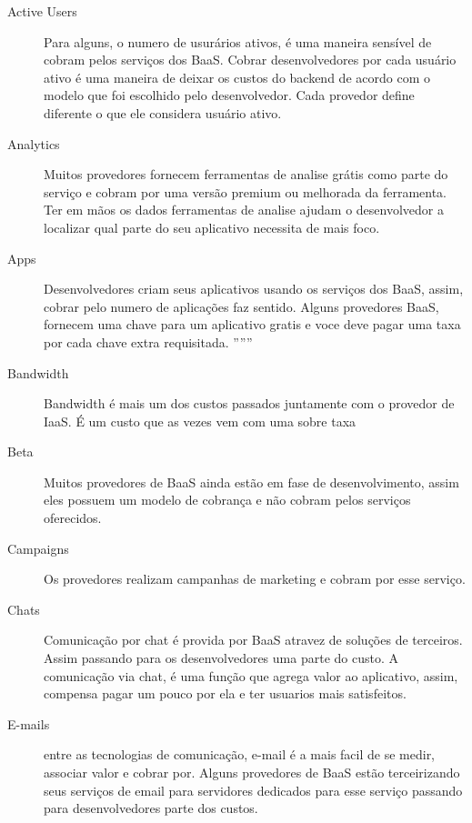 	\begin{description}
		\item[]	
		\item[Active Users] { Para alguns, o numero de usurários ativos, é uma maneira sensível de cobram pelos serviços dos BaaS. Cobrar desenvolvedores por cada usuário ativo é uma maneira de deixar os custos do backend de acordo com o modelo que foi escolhido pelo desenvolvedor. Cada provedor define diferente o que ele considera usuário ativo. }

		\item[Analytics] { Muitos provedores fornecem ferramentas de analise grátis como parte do serviço e cobram por uma versão premium ou melhorada da ferramenta. Ter em mãos os dados ferramentas de analise ajudam o desenvolvedor a localizar qual parte do seu aplicativo necessita de mais foco.}

		\item[Apps] { Desenvolvedores criam seus aplicativos usando os serviços dos BaaS, assim, cobrar pelo numero de aplicações faz sentido. Alguns provedores BaaS, fornecem uma chave para um aplicativo gratis e voce deve pagar uma taxa por cada chave extra requisitada.}
''''''
		\item[Bandwidth] { Bandwidth é mais um dos custos passados juntamente com o provedor de IaaS. É um custo que as vezes vem com uma sobre taxa}
		
		\item[Beta] { Muitos provedores de BaaS ainda estão em fase de desenvolvimento, assim eles possuem um modelo de cobrança e não cobram pelos serviços oferecidos.}
		
		\item[Campaigns] { Os provedores realizam campanhas de marketing  e cobram por esse serviço.}
		
		\item[Chats] { Comunicação por chat é provida por BaaS atravez de soluções de terceiros. Assim passando para os desenvolvedores uma parte do custo. A comunicação via chat, é uma função que agrega valor ao aplicativo, assim, compensa pagar um pouco por ela e ter usuarios mais satisfeitos. }
		
		\item[E-mails] { entre as tecnologias de comunicação, e-mail é a mais facil de se medir, associar valor e cobrar por. Alguns provedores de BaaS estão terceirizando seus serviços de email para servidores dedicados para esse serviço passando para desenvolvedores parte dos custos.}
		

\end{description}
